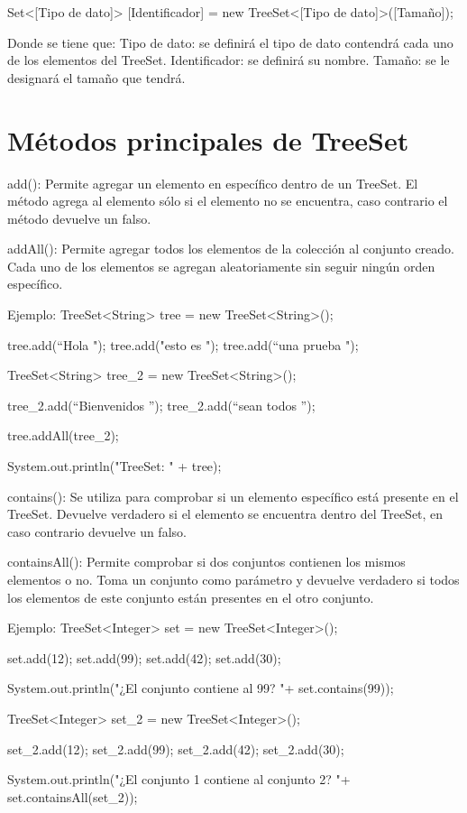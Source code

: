 \documentclass[12pt, letterpaper]{article} %
\begin{document}
Set<[Tipo de dato]> [Identificador] = new TreeSet<[Tipo de dato]>([Tamaño]);

Donde se tiene que:
Tipo de dato: se definirá el tipo de dato contendrá cada uno de los elementos del TreeSet.
Identificador: se definirá su nombre.
Tamaño: se le designará el tamaño que tendrá.

\section*{Métodos principales de TreeSet}
add():
Permite agregar un elemento en específico dentro de un TreeSet. El método agrega al elemento sólo si el elemento no se encuentra, caso contrario el método devuelve un falso.

addAll():
Permite agregar todos los elementos de la colección al conjunto creado. Cada uno de los elementos se agregan aleatoriamente sin seguir ningún orden específico.

Ejemplo:
TreeSet<String> tree = new TreeSet<String>();

tree.add(“Hola ");
tree.add("esto es ");
tree.add(“una prueba ");

TreeSet<String> tree_2 = new TreeSet<String>();

tree_2.add(“Bienvenidos ”);
tree_2.add(“sean todos ”);

tree.addAll(tree_2);

System.out.println("TreeSet: " + tree);


contains():
Se utiliza para comprobar si un elemento específico está presente en el TreeSet. Devuelve verdadero si el elemento se encuentra dentro del TreeSet, en caso contrario devuelve un falso.

containsAll():
Permite comprobar si dos conjuntos contienen los mismos elementos o no. Toma un conjunto como parámetro y devuelve verdadero si todos los elementos de este conjunto están presentes en el otro conjunto.

Ejemplo:
TreeSet<Integer> set = new TreeSet<Integer>();

set.add(12);
set.add(99);
set.add(42);
set.add(30);

System.out.println("¿El conjunto contiene al 99? "+ set.contains(99));


TreeSet<Integer> set_2 = new TreeSet<Integer>();

set_2.add(12);
set_2.add(99);
set_2.add(42);
set_2.add(30);

System.out.println("¿El conjunto 1 contiene al conjunto 2?  "+ set.containsAll(set_2));
\end{document}
